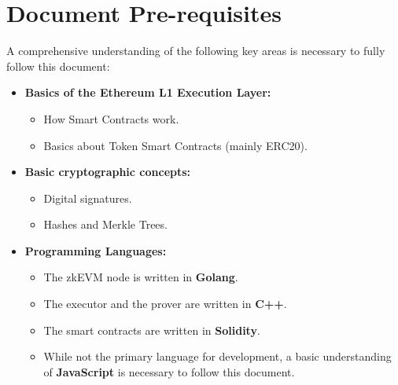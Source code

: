 




\section{Document Pre-requisites}

A comprehensive understanding of the following key areas is necessary to fully follow this document:

\begin{itemize}

\item \textbf{Basics of the Ethereum L1 Execution Layer:}

\begin{itemize}

\item How Smart Contracts work.

\item Basics about Token Smart Contracts (mainly ERC20).

\end{itemize}

\item \textbf{Basic cryptographic concepts:}

\begin{itemize}

\item Digital signatures.

\item Hashes and Merkle Trees.

\end{itemize}

\item \textbf{Programming Languages:}

\begin{itemize}

\item The zkEVM node is written in \textbf{Golang}.

\item The executor and the prover are written in \textbf{C++}.

\item The smart contracts are written in \textbf{Solidity}.

\item While not the primary language for development, a basic understanding of \textbf{JavaScript} is necessary to follow this document.

\end{itemize}

\end{itemize}





